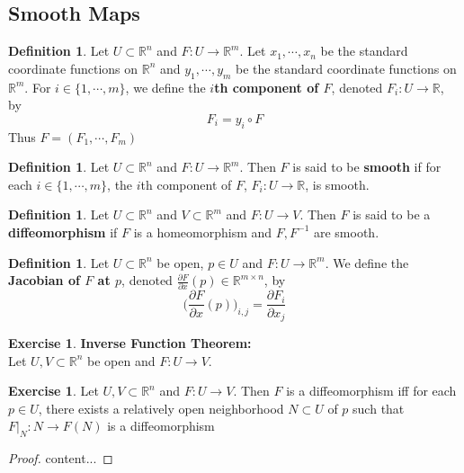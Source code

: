 \documentclass[12pt]{amsart}
\theoremstyle{definition}
\newtheorem{defn}[definition]{Definition}
\theoremstyle{definition}
\newtheorem{ex}[definition]{Exercise}
\newcommand{\R}{\mathbb{R}}
\newcommand{\p}{\partial}
\begin{document}
	
	\subsection{Smooth Maps}
	\begin{defn}
	Let $U \subset \R^n$ and $F: U \rightarrow \R^m$. Let $x_1, \cdots, x_n$ be the standard coordinate functions on $\R^n$ and $y_1, \cdots, y_m$ be the standard coordinate functions on $\R^m$. For $i \in \{1, \cdots, m\}$, we define the \textbf{$i$th component of $F$}, denoted $F_i: U \rightarrow \R$, by $$F_i = y_i \circ F$$ 
	Thus $F = (F_1, \cdots, F_m)$
	\end{defn}
	
	\begin{defn}
	Let $U \subset \R^n$ and $F: U \rightarrow \R^m$. Then $F$ is said to be \textbf{smooth} if for each $i \in \{1, \cdots, m\}$, the $i$th component of $F$, $F_i: U \rightarrow \R$, is smooth.
	\end{defn}

	\begin{defn}
		Let $U \subset \R^n$ and $V \subset \R^m$ and $F: U \rightarrow V$. Then $F$ is said to be a  \textbf{diffeomorphism} if $F$ is a homeomorphism and $F, F^{-1}$ are smooth. 
	\end{defn}
	
	\begin{defn}
	Let $U \subset \R^n$ be open, $p \in U$ and $F: U \rightarrow \R^m$. We define the \textbf{Jacobian of $F$ at $p$}, denoted $\frac{\p F}{\p x}(p) \in \R^{m \times n}$, by $$\bigg (\frac{\p F}{\p x}(p) \bigg )_{i,j} = \frac{\p F_i}{\p x_j}$$
	\end{defn}
	
	\begin{ex}\textbf{Inverse Function Theorem:}\\
	Let $U,V \subset \R^n$ be open and $F: U \rightarrow V$.
	\end{ex}
	
	\begin{ex}
		Let $U,V \subset \R^n$ and $F: U \rightarrow V$. Then $F$ is a diffeomorphism iff for each $p \in U$, there exists a relatively open neighborhood $N \subset U$ of $p$ such that $F|_N:N \rightarrow F(N)$ is a diffeomorphism
	\end{ex}
	
	\begin{proof}
		content...
	\end{proof}
\end{document}
